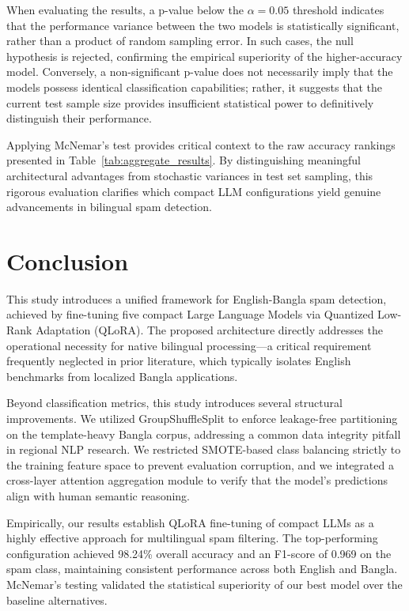 \documentclass[journal]{IEEEtran}
\begin{document}
When evaluating the results, a p-value below the $\alpha = 0.05$ threshold indicates that the performance variance between the two models is statistically significant, rather than a product of random sampling error. In such cases, the null hypothesis is rejected, confirming the empirical superiority of the higher-accuracy model. Conversely, a non-significant p-value does not necessarily imply that the models possess identical classification capabilities; rather, it suggests that the current test sample size provides insufficient statistical power to definitively distinguish their performance.

Applying McNemar's test provides critical context to the raw accuracy rankings presented in Table~\ref{tab:aggregate_results}. By distinguishing meaningful architectural advantages from stochastic variances in test set sampling, this rigorous evaluation clarifies which compact LLM configurations yield genuine advancements in bilingual spam detection.

\balance
\section{Conclusion}

This study introduces a unified framework for English-Bangla spam detection, achieved by fine-tuning five compact Large Language Models via Quantized Low-Rank Adaptation (QLoRA). The proposed architecture directly addresses the operational necessity for native bilingual processing---a critical requirement frequently neglected in prior literature, which typically isolates English benchmarks from localized Bangla applications.

Beyond classification metrics, this study introduces several structural improvements. We utilized GroupShuffleSplit to enforce leakage-free partitioning on the template-heavy Bangla corpus, addressing a common data integrity pitfall in regional NLP research. We restricted SMOTE-based class balancing strictly to the training feature space to prevent evaluation corruption, and we integrated a cross-layer attention aggregation module to verify that the model's predictions align with human semantic reasoning.

Empirically, our results establish QLoRA fine-tuning of compact LLMs as a highly effective approach for multilingual spam filtering. The top-performing configuration achieved 98.24\% overall accuracy and an F1-score of 0.969 on the spam class, maintaining consistent performance across both English and Bangla. McNemar's testing validated the statistical superiority of our best model over the baseline alternatives.
\end{document}
